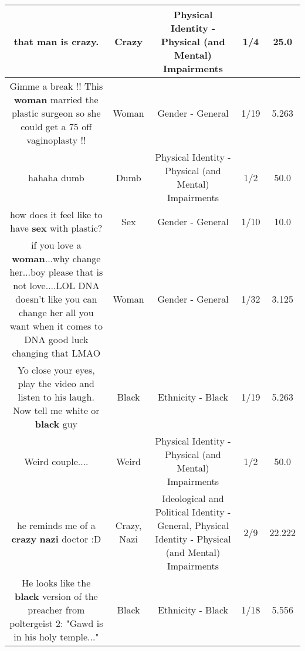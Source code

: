 \documentclass[11pt]{article}
\newlength\mylength
\begin{document}
\begin{center}
\begin{longtable}{|C{.65\mylength}|C{.30\mylength}|C{.12\mylength}|C{.12\mylength}|C{.12\mylength}|}
  \small that man is \textbf{crazy}.\normalsize   & Crazy & Physical Identity - Physical (and Mental) Impairments & 1/4 & 25.0 \\  \hline
  \small Gimme a break !!  This \textbf{woman} married the plastic surgeon so she could get a 75 off vaginoplasty !!\normalsize   & Woman & Gender - General & 1/19 & 5.263 \\  \hline
  \small hahaha dumb\normalsize   & Dumb & Physical Identity - Physical (and Mental) Impairments & 1/2 & 50.0 \\  \hline
  \small how does it feel like to have \textbf{sex} with plastic?\normalsize   & Sex & Gender - General & 1/10 & 10.0 \\  \hline
  \small if you love a \textbf{woman}...why change her...boy please that is not love....LOL  DNA doesn't like you can change her all you want when it comes to DNA good luck changing that LMAO\normalsize   & Woman & Gender - General & 1/32 & 3.125 \\  \hline
  \small Yo close your eyes, play the video and listen to his laugh. Now tell me white or \textbf{black} guy\normalsize   & Black & Ethnicity - Black & 1/19 & 5.263 \\  \hline
  \small Weird couple....\normalsize   & Weird & Physical Identity - Physical (and Mental) Impairments & 1/2 & 50.0 \\  \hline
  \small he reminds me of a \textbf{crazy} \textbf{nazi} doctor :D\normalsize   & Crazy, Nazi &  Ideological and Political Identity - General, Physical Identity - Physical (and Mental) Impairments & 2/9 & 22.222 \\  \hline
  \small He looks like the \textbf{black} version of the preacher from poltergeist 2: "Gawd is in his holy temple..."\normalsize   & Black & Ethnicity - Black & 1/18 & 5.556 \\  \hline

\end{longtable}
\end{center}
\end{document}
